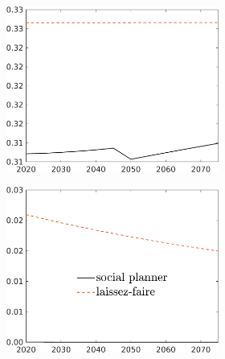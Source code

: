 \begin{figure}[h!!]
\begin{subfigure}{1\textwidth}
\begin{subfigure}[]{0.32\textwidth}
		\end{subfigure}	
		\begin{subfigure}[]{0.32\textwidth}
			\includegraphics[width=1\textwidth]{../../codding_model/own_basedOnFried/optimalPol_010922_revision/figures/all_13Sept22_Tplus30/hl_LFCompSP_T_regime4_knspil1_spillover0_noskill0_sep0_xgrowth0_PV1_etaa0.79_lgd0.png}
		\end{subfigure}
		\begin{subfigure}[]{0.32\textwidth}
			\includegraphics[width=1\textwidth]{../../codding_model/own_basedOnFried/optimalPol_010922_revision/figures/all_13Sept22_Tplus30/sff_LFCompSP_T_regime4_knspil1_spillover0_noskill0_sep0_xgrowth0_PV1_etaa0.79_lgd1.png}

\end{subfigure}
\end{subfigure}
\end{figure}
